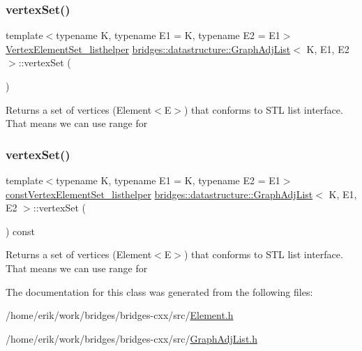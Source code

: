 \subsubsection{\texorpdfstring{vertex\+Set()}{vertexSet()}\hspace{0.1cm}{\footnotesize\ttfamily [1/2]}}
{\footnotesize\ttfamily template$<$typename K, typename E1 = K, typename E2 = E1$>$ \\
\hyperlink{classbridges_1_1datastructure_1_1_graph_adj_list_1_1_vertex_element_set__listhelper}{Vertex\+Element\+Set\+\_\+listhelper} \hyperlink{classbridges_1_1datastructure_1_1_graph_adj_list}{bridges\+::datastructure\+::\+Graph\+Adj\+List}$<$ K, E1, E2 $>$\+::vertex\+Set (\begin{DoxyParamCaption}{ }\end{DoxyParamCaption})\hspace{0.3cm}{\ttfamily [inline]}}

Returns a set of vertices (Element$<$\+E$>$) that conforms to S\+TL list interface. That means we can use range for \mbox{\label{classbridges_1_1datastructure_1_1_graph_adj_list_a5ef96f5df21b2f9743b7bb79c10cf090}} 
\subsubsection{\texorpdfstring{vertex\+Set()}{vertexSet()}\hspace{0.1cm}{\footnotesize\ttfamily [2/2]}}
{\footnotesize\ttfamily template$<$typename K, typename E1 = K, typename E2 = E1$>$ \\
\hyperlink{classbridges_1_1datastructure_1_1_graph_adj_list_1_1const_vertex_element_set__listhelper}{const\+Vertex\+Element\+Set\+\_\+listhelper} \hyperlink{classbridges_1_1datastructure_1_1_graph_adj_list}{bridges\+::datastructure\+::\+Graph\+Adj\+List}$<$ K, E1, E2 $>$\+::vertex\+Set (\begin{DoxyParamCaption}{ }\end{DoxyParamCaption}) const\hspace{0.3cm}{\ttfamily [inline]}}

Returns a set of vertices (Element$<$\+E$>$) that conforms to S\+TL list interface. That means we can use range for 

The documentation for this class was generated from the following files\+:\begin{DoxyCompactItemize}
\item 
/home/erik/work/bridges/bridges-\/cxx/src/\hyperlink{_element_8h}{Element.\+h}\item 
/home/erik/work/bridges/bridges-\/cxx/src/\hyperlink{_graph_adj_list_8h}{Graph\+Adj\+List.\+h}\end{DoxyCompactItemize}
